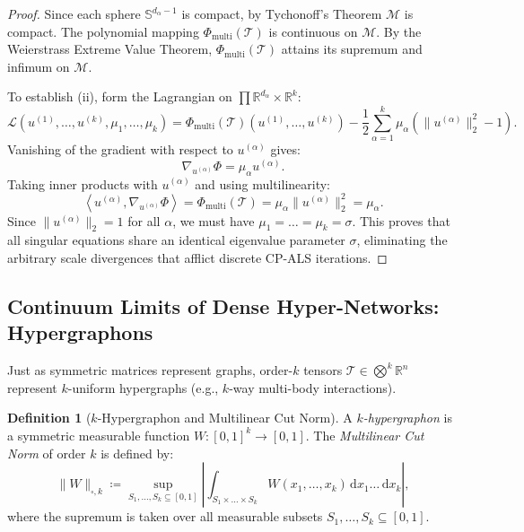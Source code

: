 \documentclass[11pt,a4paper,reqno]{amsart}
\theoremstyle{definition}
\newtheorem{definition}[theorem]{Definition}
\numberwithin{equation}{section}
\newcommand{\R}{\mathbb{R}}
\newcommand{\Sph}{\mathbb{S}}
\newcommand{\inner}[2]{\left\langle #1, #2 \right\rangle}
\newcommand{\dif}{\,\mathrm{d}}
\begin{document}
\begin{proof}
Since each sphere $\Sph^{d_\alpha - 1}$ is compact, by Tychonoff's Theorem $\mathcal{M}$ is compact. The polynomial mapping $\Phi_{\mathrm{multi}}(\mathcal{T})$ is continuous on $\mathcal{M}$. By the Weierstrass Extreme Value Theorem, $\Phi_{\mathrm{multi}}(\mathcal{T})$ attains its supremum and infimum on $\mathcal{M}$. 

To establish (ii), form the Lagrangian on $\prod \R^{d_\alpha} \times \R^k$:
\begin{equation}
    \mathcal{L}(u^{(1)}, \dots, u^{(k)}, \mu_1, \dots, \mu_k) = \Phi_{\mathrm{multi}}(\mathcal{T})(u^{(1)}, \dots, u^{(k)}) - \frac{1}{2} \sum_{\alpha=1}^k \mu_\alpha (\|u^{(\alpha)}\|_2^2 - 1).
\end{equation}
Vanishing of the gradient with respect to $u^{(\alpha)}$ gives:
\begin{equation}
    \nabla_{u^{(\alpha)}} \Phi = \mu_\alpha u^{(\alpha)}.
\end{equation}
Taking inner products with $u^{(\alpha)}$ and using multilinearity:
\begin{equation}
    \inner{u^{(\alpha)}}{\nabla_{u^{(\alpha)}} \Phi} = \Phi_{\mathrm{multi}}(\mathcal{T}) = \mu_\alpha \|u^{(\alpha)}\|_2^2 = \mu_\alpha.
\end{equation}
Since $\|u^{(\alpha)}\|_2 = 1$ for all $\alpha$, we must have $\mu_1 = \dots = \mu_k = \sigma$. This proves that all singular equations share an identical eigenvalue parameter $\sigma$, eliminating the arbitrary scale divergences that afflict discrete CP-ALS iterations.
\end{proof}

\subsection{Continuum Limits of Dense Hyper-Networks: Hypergraphons}
\label{subsec:hypergraphons}

Just as symmetric matrices represent graphs, order-$k$ tensors $\mathcal{T} \in \bigotimes^k \R^n$ represent $k$-uniform hypergraphs (e.g., $k$-way multi-body interactions).

\begin{definition}[$k$-Hypergraphon and Multilinear Cut Norm]
A \emph{$k$-hypergraphon} is a symmetric measurable function $W \colon [0, 1]^k \to [0, 1]$. The \emph{Multilinear Cut Norm} of order $k$ is defined by:
\begin{equation}
    \label{eq:hypergraphon_cutnorm}
    \|W\|_{\square, k} \coloneqq \sup_{S_1, \dots, S_k \subseteq [0, 1]} \left| \int_{S_1 \times \dots \times S_k} W(x_1, \dots, x_k) \dif x_1 \dots \dif x_k \right|,
\end{equation}
where the supremum is taken over all measurable subsets $S_1, \dots, S_k \subseteq [0, 1]$.
\end{definition}
\end{document}
